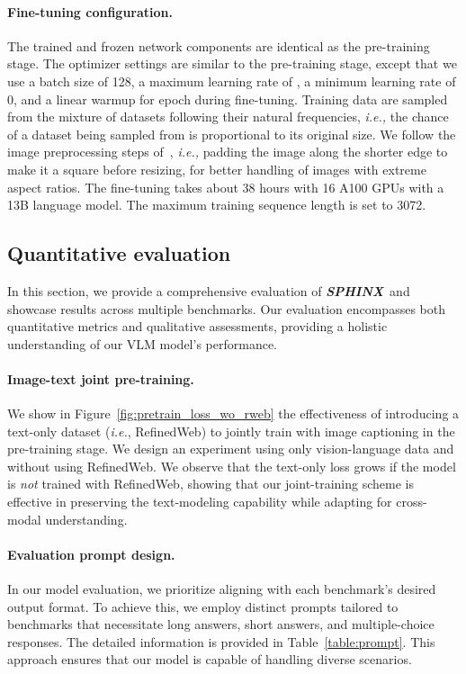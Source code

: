 \documentclass{article} \usepackage{iclr2024_conference,times}
\newcommand{\sphinx}{\textcolor{Goldenrod3}{\textbf{\textit{SPHINX}}}~}
\newcommand{\ie}{{\it i.e.}}
\begin{document}
\paragraph{Fine-tuning configuration.}
The trained and frozen network components are identical as the pre-training stage. The optimizer settings are similar to the pre-training stage, except that
we use a batch size of 128, a maximum learning rate of , a minimum learning rate of 0, and a linear warmup for  epoch during fine-tuning.
Training data are sampled from the mixture of datasets following their natural frequencies, {\it i.e.,} the chance of a dataset being sampled from is proportional to its original size.
We follow the image preprocessing steps of~\citep{chen2023shikra,Liu2023ImprovedBW}, {\it i.e.,} padding the image along the shorter edge to make it a square before resizing, for better handling of images with extreme aspect ratios. The fine-tuning takes about 38 hours with 16 A100 GPUs with a 13B language model. The maximum training sequence length is set to 3072.

\subsection{Quantitative evaluation}
In this section, we provide a comprehensive evaluation of \sphinx and showcase results across multiple benchmarks. Our evaluation encompasses both quantitative metrics and qualitative assessments, providing a holistic understanding of our VLM model's performance.

\paragraph{Image-text joint pre-training.} We show in Figure~\ref{fig:pretrain_loss_wo_rweb} the effectiveness of introducing a text-only dataset (\ie, RefinedWeb) to jointly train with image captioning in the pre-training stage. We design an experiment using only vision-language data and without using RefinedWeb. We observe that the text-only loss grows if the model is {\it not} trained with RefinedWeb, showing that our joint-training scheme is effective in preserving the text-modeling capability while adapting for cross-modal understanding.



\paragraph{Evaluation prompt design.}
In our model evaluation, we prioritize aligning with each benchmark's desired output format. To achieve this, we employ distinct prompts tailored to benchmarks that necessitate long answers, short answers, and multiple-choice responses. The detailed information is provided in Table~\ref{table:prompt}. This approach ensures that our model is capable of handling diverse scenarios. 
\end{document}
